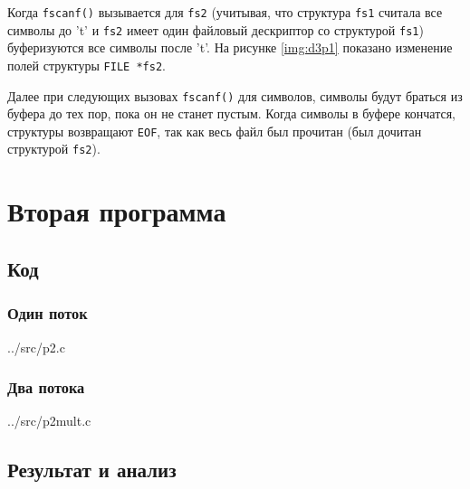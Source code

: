 
Когда \texttt{fscanf()} вызывается для \texttt{fs2} (учитывая, что структура \texttt{fs1} считала все символы до 't' и \texttt{fs2} имеет один файловый дескриптор со структурой \texttt{fs1}) буферизуются все символы после 't'. На рисунке \ref{img:d3p1} показано изменение полей структуры \texttt{FILE *fs2}.


Далее при следующих вызовах \texttt{fscanf()} для символов, символы будут браться из буфера до тех пор, пока он не станет пустым. Когда символы в буфере кончатся, структуры возвращают \texttt{EOF}, так как весь файл был прочитан (был дочитан структурой \texttt{fs2}).

\chapter{Вторая программа}

\section{Код}

\subsection{Один поток}

\begin{lstinputlisting}[
        style=cstyle,
        caption={Вторая программа с одним потоком},
        label={lst:2}
    ]{../src/p2.c}
\end{lstinputlisting}

\subsection{Два потока}

\begin{lstinputlisting}[
        style=cstyle,
        caption={Вторая программа с двумя потоками},
        label={lst:2mult}
    ]{../src/p2mult.c}
\end{lstinputlisting}

\clearpage

\section{Результат и анализ}

